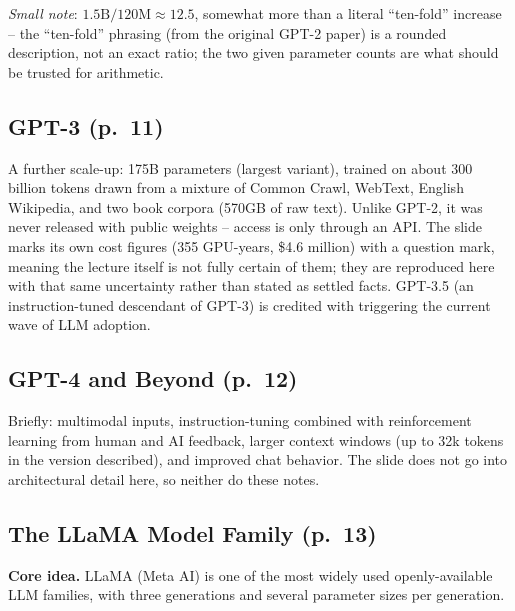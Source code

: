 \documentclass[11pt]{article}
\begin{document}
\emph{Small note}: $1.5\text{B}/120\text{M}\approx12.5$, somewhat more than a literal ``ten-fold'' increase -- the ``ten-fold'' phrasing (from the original GPT-2 paper) is a rounded description, not an exact ratio; the two given parameter counts are what should be trusted for arithmetic.

\subsection{GPT-3 (p.\ 11)}

A further scale-up: 175B parameters (largest variant), trained on about 300 billion tokens drawn from a mixture of Common Crawl, WebText, English Wikipedia, and two book corpora (570GB of raw text). Unlike GPT-2, it was never released with public weights -- access is only through an API. The slide marks its own cost figures (355 GPU-years, \$4.6 million) with a question mark, meaning the lecture itself is not fully certain of them; they are reproduced here with that same uncertainty rather than stated as settled facts. GPT-3.5 (an instruction-tuned descendant of GPT-3) is credited with triggering the current wave of LLM adoption.

\subsection{GPT-4 and Beyond (p.\ 12)}

Briefly: multimodal inputs, instruction-tuning combined with reinforcement learning from human and AI feedback, larger context windows (up to 32k tokens in the version described), and improved chat behavior. The slide does not go into architectural detail here, so neither do these notes.

\subsection{The LLaMA Model Family (p.\ 13)}

\textbf{Core idea.} LLaMA (Meta AI) is one of the most widely used openly-available LLM families, with three generations and several parameter sizes per generation.
\end{document}
